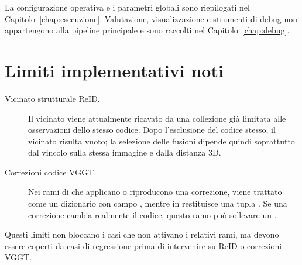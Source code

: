 La configurazione operativa e i parametri globali sono riepilogati nel
Capitolo~\ref{chap:esecuzione}. Valutazione, visualizzazione e strumenti di
debug non appartengono alla pipeline principale e sono raccolti nel
Capitolo~\ref{chap:debug}.

\section{Limiti implementativi noti}

\begin{description}
  \item[Vicinato strutturale ReID.] Il vicinato viene attualmente ricavato da
  una collezione già limitata alle osservazioni dello stesso codice. Dopo
  l'esclusione del codice stesso, il vicinato risulta vuoto; la selezione delle
  fusioni dipende quindi soprattutto dal vincolo sulla stessa immagine e dalla
  distanza 3D.

  \item[Correzioni codice VGGT.] Nei rami di
   che applicano o riproducono una correzione,
   viene trattato come un dizionario con campo
  , mentre in  restituisce una tupla
  . Se una correzione cambia realmente il codice, questo
  ramo può sollevare un .
\end{description}

Questi limiti non bloccano i casi che non attivano i relativi rami, ma devono
essere coperti da casi di regressione prima di intervenire su ReID o correzioni
VGGT.
